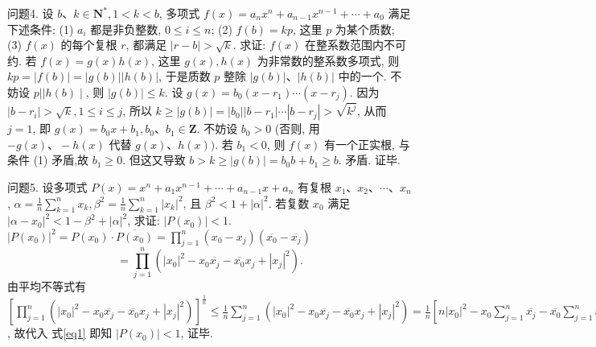 问题4. 设 $b 、 k \in \mathbf{N}^*, 1<k<b$, 多项式 $f(x)=a_n x^n+a_{n-1} x^{n-1}+\cdots+a_0$ 满足下述条件:
(1) $a_i$ 都是非负整数, $0 \leqslant i \leqslant n$;
(2) $f(b)=k p$, 这里 $p$ 为某个质数;
(3) $f(x)$ 的每个复根 $r$, 都满足 $|r-b|>\sqrt{k}$.
求证: $f(x)$ 在整系数范围内不可约.
若 $f(x)=g(x) h(x)$, 这里 $g(x), h(x)$ 为非常数的整系数多项式, 则 $k p=|f(b)|=|g(b)||h(b)|$, 于是质数 $p$ 整除 $|g(b)| 、|h(b)|$ 中的一个.
不妨设 $p|| h(b) \mid$, 则 $|g(b)| \leqslant k$. 设 $g(x)=b_0\left(x-r_1\right) \cdots\left(x-r_j\right)$. 因为 $\left|b-r_i\right|>\sqrt{k}, 1 \leqslant i \leqslant j$, 所以 $k \geqslant|g(b)|=\left|b_0\right|\left|b-r_1\right| \cdots\left|b-r_j\right|> \sqrt{k^j}$, 从而 $j=1$, 即 $g(x)=b_0 x+b_1, b_0 、 b_1 \in \mathbf{Z}$. 不妨设 $b_0>0$ (否则, 用 $-g(x) 、-h(x)$ 代替 $g(x) 、 h(x))$. 若 $b_1<0$, 则 $f(x)$ 有一个正实根, 与条件 (1) 矛盾,故 $b_1 \geqslant 0$. 但这又导致 $b>k \geqslant|g(b)|=b_0 b+b_1 \geqslant b$. 矛盾.
证毕.



问题5. 设多项式 $P(x)=x^n+a_1 x^{n-1}+\cdots+a_{n-1} x+a_n$ 有复根 $x_1 、 x_2 、 \cdots 、 x_n$, $\alpha=\frac{1}{n} \sum_{k=1}^n x_k, \beta^2=\frac{1}{n} \sum_{k=1}^n\left|x_k\right|^2$, 且 $\beta^2<1+|\alpha|^2$. 若复数 $x_0$ 满足 $\left|\alpha-x_0\right|^2<1-\beta^2+|\alpha|^2$, 求证: $\left|P\left(x_0\right)\right|<1$.
$\left|P\left(x_0\right)\right|^2=P\left(x_0\right) \cdot \overline{P\left(x_0\right)}=\prod_{j=1}^n\left(x_0-x_j\right)\left(\overline{x_0}-\overline{x_j}\right)$
$$
=\prod_{j=1}^n\left(\left|x_0\right|^2-x_0 \overline{x_j}-\overline{x_0} x_j+\left|x_j\right|^2\right) . \label{eq1}
$$
由平均不等式有 $\left[\prod_{j=1}^n\left(\left|x_0\right|^2-x_0 \overline{x_j}-\overline{x_0} x_j+\left|x_j\right|^2\right)\right]^{\frac{1}{n}} \leqslant \frac{1}{n} \sum_{j=1}^n\left(\left|x_0\right|^2-\right. \left.x_0 \overline{x_j}-\overline{x_0} x_j+\left|x_j\right|^2\right)=\frac{1}{n}\left[n\left|x_0\right|^2-x_0 \sum_{j=1}^n \overline{x_j}-\overline{x_0} \sum_{j=1}^n x_j+\sum_{j=1}^n\left|x_j\right|^2\right]= \left|x_0-\alpha\right|^2+\beta^2-|\alpha|^2<1$, 故代入 式\ref{eq1} 即知 $\left|P\left(x_0\right)\right|<1$, 证毕.



